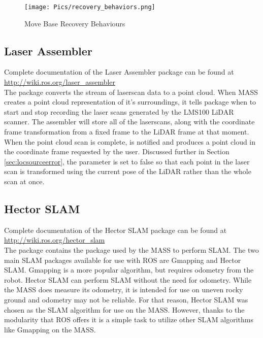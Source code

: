 \begin{figure}[H]
    \centering
    \texttt{[image: Pics/recovery\_behaviors.png]}
    \caption{Move Base Recovery Behaviours \cite{rosmovebase}}
    \label{fig:recovery}
\end{figure}

\subsection{Laser Assembler}


Complete documentation of the Laser Assembler package can be found at \url{http://wiki.ros.org/laser_assembler}\\

The  package converts the stream of laserscan data to a point cloud. When MASS creates a point cloud representation of it's surroundings, it tells  package when to start and stop recording the laser scans generated by the LMS100 LiDAR scanner. The assembler will store all of the laserscans, along with the coordinate frame transformation from a fixed frame to the LiDAR frame at that moment. When the point cloud scan is complete,  is notified and produces a point cloud in the coordinate frame requested by the user. Discussed further in Section \ref{sec:locsourceerror}, the parameter  is set to false so that each point in the laser scan is transformed using the current pose of the LiDAR rather than the whole scan at once.\\

\subsection{Hector SLAM}

Complete documentation of the Hector SLAM package can be found at \url{http://wiki.ros.org/hector_slam}\\

The  package contains the  package used by the MASS to perform SLAM. The two main SLAM packages available for use with ROS are Gmapping and Hector SLAM. Gmapping is a more popular algorithm, but requires odometry from the robot. Hector SLAM can perform SLAM without the need for odometry. While the MASS does measure its odometry, it is intended for use on uneven rocky ground and odometry may not be reliable. For that reason, Hector SLAM was chosen as the SLAM algorithm for use on the MASS. However, thanks to the modularity that ROS offers it is a simple task to utilize other SLAM algorithms like Gmapping on the MASS.\\

